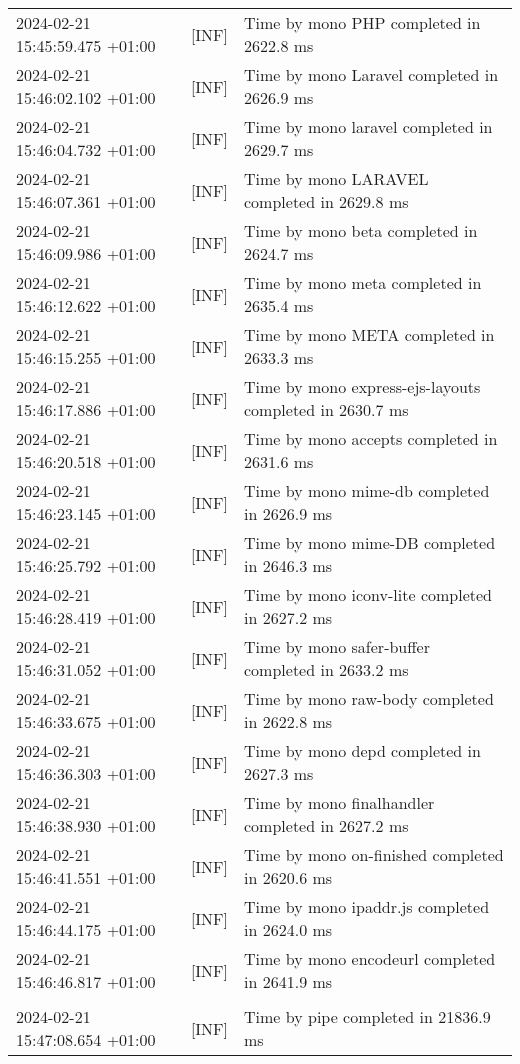 {{\begin{tabularx}{\textwidth}{|l|l|X|}
                    2024-02-21 15:45:59.475 +01:00 & [INF] & Time by mono PHP completed in 2622.8 ms \\
                    2024-02-21 15:46:02.102 +01:00 & [INF] & Time by mono Laravel completed in 2626.9 ms \\
                    2024-02-21 15:46:04.732 +01:00 & [INF] & Time by mono laravel completed in 2629.7 ms \\
                    2024-02-21 15:46:07.361 +01:00 & [INF] & Time by mono LARAVEL completed in 2629.8 ms \\
                    2024-02-21 15:46:09.986 +01:00 & [INF] & Time by mono beta completed in 2624.7 ms \\
                    2024-02-21 15:46:12.622 +01:00 & [INF] & Time by mono meta completed in 2635.4 ms \\
                    2024-02-21 15:46:15.255 +01:00 & [INF] & Time by mono META completed in 2633.3 ms \\
                    2024-02-21 15:46:17.886 +01:00 & [INF] & Time by mono express-ejs-layouts completed in 2630.7 ms \\
                    2024-02-21 15:46:20.518 +01:00 & [INF] & Time by mono accepts completed in 2631.6 ms \\
                    2024-02-21 15:46:23.145 +01:00 & [INF] & Time by mono mime-db completed in 2626.9 ms \\
                    2024-02-21 15:46:25.792 +01:00 & [INF] & Time by mono mime-DB completed in 2646.3 ms \\
                    2024-02-21 15:46:28.419 +01:00 & [INF] & Time by mono iconv-lite completed in 2627.2 ms \\
                    2024-02-21 15:46:31.052 +01:00 & [INF] & Time by mono safer-buffer completed in 2633.2 ms \\
                    2024-02-21 15:46:33.675 +01:00 & [INF] & Time by mono raw-body completed in 2622.8 ms \\
                    2024-02-21 15:46:36.303 +01:00 & [INF] & Time by mono depd completed in 2627.3 ms \\
                    2024-02-21 15:46:38.930 +01:00 & [INF] & Time by mono finalhandler completed in 2627.2 ms \\
                    2024-02-21 15:46:41.551 +01:00 & [INF] & Time by mono on-finished completed in 2620.6 ms \\
                    2024-02-21 15:46:44.175 +01:00 & [INF] & Time by mono ipaddr.js completed in 2624.0 ms \\
                    2024-02-21 15:46:46.817 +01:00 & [INF] & Time by mono encodeurl completed in 2641.9 ms \\
                    & & \\
                    2024-02-21 15:47:08.654 +01:00 & [INF] & Time by pipe completed in 21836.9 ms \\
                    \hline
                \end{tabularx}
            }
        }
